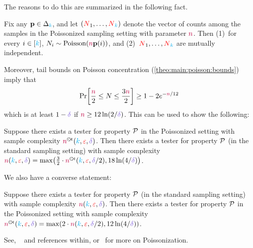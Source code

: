 The reasons to do this are summarized in the following fact.
\begin{fact}
Fix any $\mathbf{p}\in\Delta_{{\textcolor{cyan}{k}}}$, and let $(\textcolor{red}{N}_1,\dots,\textcolor{red}{N}_{\textcolor{cyan}{k}})$ denote the vector of counts among the samples in the Poissonized sampling setting with parameter ${\textcolor{purple}{n}}$. Then (1)~for every $i\in[{\textcolor{cyan}{k}}]$, $N_i\sim\poisson{\ns\p(i)}$, and (2)~$\textcolor{red}{N}_1,\dots,\textcolor{red}{N}_{\textcolor{cyan}{k}}$ are mutually independent.
\end{fact}
Moreover, tail bounds on Poisson concentration (\cref{theo:main:poisson:bounds}) imply that
\begin{equation}
	\bPr{ \frac{\ns}{2} \leq N \leq \frac{3\ns}{2}} \geq 1-2e^{-\ns/12}
\end{equation}
which is at least $1-\errprob$ if $\ns \geq 12\ln(2/\errprob)$. This can be used to show the following:
\begin{lemma}
	Suppose there exists a tester for property $\mathcal{P}$ in the Poissonized setting with sample complexity $\ns^{\fish}(\ab,\dst,\errprob)$. Then there exists a tester for property $\mathcal{P}$ (in the standard sampling setting) with sample complexity $\ns(\ab,\dst,\errprob)=\max\Paren{\frac{3}{2}\cdot \ns^{\fish}(\ab,\dst,\errprob/2), 18\ln(4/\errprob)}$.
\end{lemma}
\noindent We also have a converse statement:
\begin{lemma}
	Suppose there exists a tester for property $\mathcal{P}$ (in the standard sampling setting) with sample complexity $\ns(\ab,\dst,\errprob)$. Then there exists a tester for property $\mathcal{P}$ in the Poissonized setting with sample complexity $\ns^{\fish}(\ab,\dst,\errprob)=\max\Paren{2\cdot \ns(\ab,\dst,\errprob/2), 12\ln(4/\errprob)}$.
\end{lemma}
See, \eg~\citet[Section~4.3]{Valiant:11} and references within, or~\citet[Appendix~D.3]{Canonne:15:Survey} for more on Poissonization.